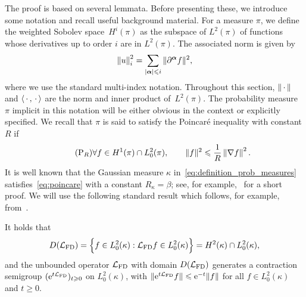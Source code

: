 \documentclass[11pt,a4paper]{article}
\begin{document}
The proof is based on several lemmata.
Before presenting these, we introduce some notation and recall useful background material.
For a measure $\pi$, we define the weighted Sobolev space~$H^i(\pi)$ as the subspace of $L^2(\pi)$
of functions whose derivatives up to order $i$ are in $L^2(\pi)$.
The associated norm is given by
\[
    \norm{u}_i^2 = \sum_{|\vect \alpha| \leq i} \norm*{\partial^{\vect \alpha} f}^2,
\]
where we use the standard multi-index notation.
Throughout this section, $\norm{\dummy}$ and $\ip{\dummy}{\dummy}$ are the norm and inner product of~$L^2(\pi)$.
The probability measure $\pi$ implicit in this notation will be either obvious in the context or explicitly specified.
We recall that $\pi$ is said to satisfy the Poincaré inequality with constant $R$ if
\begin{equation}
    \label{eq:poincare}
    \tag{P$_R$}
    \forall f \in H^1(\pi) \cap L^2_0(\pi), \qquad
    \norm*{f}^2 \leq \frac{1}{R} \norm{\grad f}^2.
\end{equation}
It is well known that the Gaussian measure $\kappa$ in~\eqref{eq:definition_prob_measures} satisfies~\eqref{eq:poincare} with a constant $R_{\kappa} = \beta$;
see, for example,~\cite[Lemma 2.1]{MR4071827} for a short proof.
We will use the following standard result which follows,
for example, from~\cite[Chapter 9]{lorenzi2006analytical}.
\begin{lemma}
    \label{lemma:semigroup}
    It holds that
    \[
        D(\mathcal L_{\rm FD}) = \Bigl\{ f \in L^2_0(\kappa): \mathcal L_{\rm FD} f \in L^2_0(\kappa) \Bigr\} = H^2(\kappa) \cap L^2_0(\kappa),
    \]
    and the unbounded operator
    \(
        \mathcal L_{\rm FD}
    \)
    with domain $D(\mathcal L_{\rm FD})$
    generates a contraction semigroup $(\mathrm{e}^{t \mathcal L_{\rm FD}})_{t \geqslant 0}$ on $L^2_0(\kappa)$,
    with $\lVert \mathrm{e}^{t \mathcal L_{\rm FD}} f \rVert \leqslant \mathrm{e}^{-t} \lVert f \rVert$ for all $f \in L^2_0(\kappa)$ and $t \geq 0$.
\end{lemma}
\end{document}

